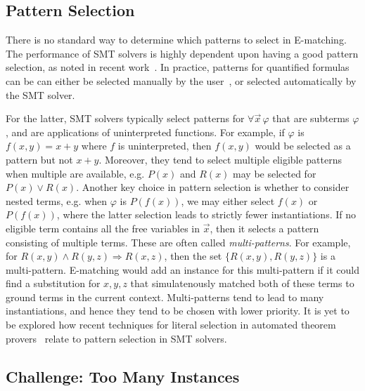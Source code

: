 \documentclass[oribibl]{llncs}
\begin{document}
\subsection{Pattern Selection}
There is no standard way to determine which patterns to select in E-matching.
The performance of SMT solvers is highly dependent upon having a good pattern selection, as noted in recent work~\cite{}.
In practice, patterns for quantified formulas can be can either be selected manually by the user~\cite{},
or selected automatically by the SMT solver.

For the latter, SMT solvers typically select patterns for $\forall \vec x\, \varphi$ that are subterms $\varphi$,
and are applications of uninterpreted functions.
For example, if $\varphi$ is $f( x, y ) = x + y$ where $f$ is uninterpreted, then $f( x, y )$ would be selected as a pattern
but not $x + y$.
Moreover, they tend to select multiple eligible patterns when multiple are available, 
e.g. $P( x )$ and $R( x )$ may be selected for $P( x ) \vee R( x )$.
Another key choice in pattern selection is whether to consider nested terms, e.g. when $\varphi$ is $P( f( x ) )$,
we may either select $f( x )$ or $P( f( x ) )$, where the latter selection leads to strictly fewer instantiations.
If no eligible term contains all the free variables in $\vec x$, then it selects a pattern consisting of multiple terms.
These are often called \emph{multi-patterns}.
For example, for $R( x, y ) \wedge R( y, z ) \Rightarrow R( x, z )$, then the set $\{ R( x, y ), R( y, z ) \}$ is a multi-pattern.
E-matching would add an instance for this multi-pattern if it could find a substitution for $x, y, z$
that simulatenously matched both of these terms to ground terms in the current context.
Multi-patterns tend to lead to many instantiations, and hence they tend to be chosen with lower priority.
It is yet to be explored how recent techniques for literal selection in automated theorem provers~\cite{}
relate to pattern selection in SMT solvers.

\subsection{Challenge: Too Many Instances}
\end{document}
